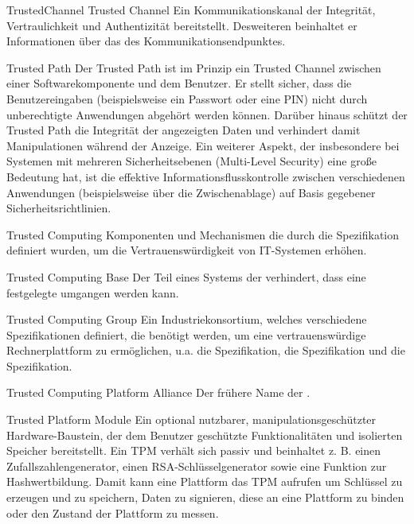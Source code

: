 	
\glosentry
	{TrustedChannel}
	{Trusted Channel}
	{Ein Kommunikationskanal der Integrit\"at, Vertraulichkeit und
  	 Authentizit\"at bereitstellt. Desweiteren beinhaltet er Informationen
	 \"uber das \Behavior des Kommunikationsendpunktes.}

	{Trusted Path}
	{Der Trusted Path ist im Prinzip ein Trusted Channel zwischen einer Softwarekomponente
	und dem Benutzer. Er stellt sicher, dass die Benutzereingaben (beispielsweise ein
	Passwort oder eine PIN) nicht durch unberechtigte Anwendungen abgeh\"ort werden k\"onnen.
	Dar\"uber hinaus sch\"utzt der Trusted Path die Integrit\"at der angezeigten Daten und verhindert
	damit Manipulationen w\"ahrend der Anzeige. Ein weiterer Aspekt, der insbesondere
	bei Systemen mit mehreren Sicherheitsebenen (Multi-Level Security) eine gro\ss{}e Bedeutung
	hat, ist die effektive Informationsflusskontrolle zwischen verschiedenen Anwendungen
	(beispielsweise \"uber die Zwischenablage) auf Basis gegebener Sicherheitsrichtlinien.}

	{Trusted Computing}
	{Komponenten und Mechanismen die durch die \TCG Spezifikation
         definiert wurden, um die Vertrauensw\"urdigkeit von IT-Systemen 
	 erh\"ohen.}

	{Trusted Computing Base}
	{Der Teil eines Systems der verhindert, dass eine festgelegte
	\SecurityPolicy umgangen werden kann.}


	{Trusted Computing Group}
        {Ein Industriekonsortium, welches verschiedene Spezifikationen definiert, die ben\"otigt werden, um eine vertrauensw\"urdige Rechnerplattform zu erm\"oglichen, u.a. die \TPM Spezifikation, die \TSS Spezifikation und die \TNC Spezifikation.}

	{Trusted Computing Platform Alliance}
	{Der fr\"uhere Name der \TCG.}

	{Trusted Platform Module}
	{Ein optional nutzbarer, manipulationsgeschützter Hardware-Baustein, der dem Benutzer geschützte Funktionalitäten und isolierten Speicher bereitstellt. Ein TPM verhält sich passiv und beinhaltet z. B. einen Zufallszahlengenerator, einen RSA-Schlüsselgenerator sowie eine Funktion zur Hashwertbildung. Damit kann eine Plattform das TPM aufrufen um Schlüssel zu erzeugen und zu speichern, Daten zu signieren, diese an eine Plattform zu binden oder den Zustand der Plattform zu messen.}


